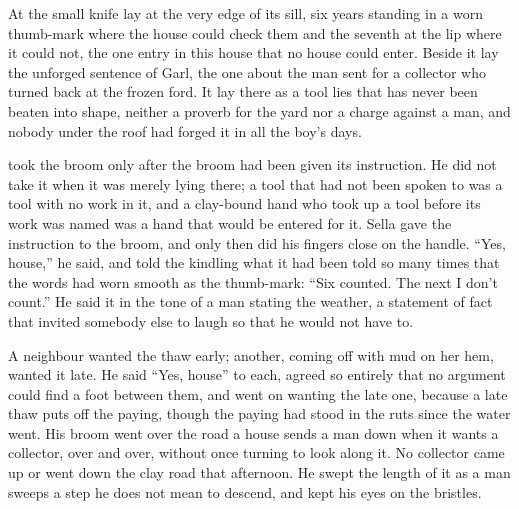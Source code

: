 \scenebreak

At  the small knife lay at the very edge of its sill, six years standing in a worn thumb-mark where the house could check them and the seventh at the lip where it could not, the one entry in this house that no house could enter. Beside it lay the unforged sentence of Garl, the one about the man sent for a collector who turned back at the frozen ford. It lay there as a tool lies that has never been beaten into shape, neither a proverb for the yard nor a charge against a man, and nobody under the roof had forged it in all the boy's days.

 took the broom only after the broom had been given its instruction. He did not take it when it was merely lying there; a tool that had not been spoken to was a tool with no work in it, and a clay-bound hand who took up a tool before its work was named was a hand that would be entered for it. Sella gave the instruction to the broom, and only then did his fingers close on the handle. “Yes, house,” he said, and told the kindling what it had been told so many times that the words had worn smooth as the thumb-mark: “Six counted. The next I don't count.” He said it in the tone of a man stating the weather, a statement of fact that invited somebody else to laugh so that he would not have to.

A neighbour wanted the thaw early; another, coming off  with mud on her hem, wanted it late. He said “Yes, house” to each, agreed so entirely that no argument could find a foot between them, and went on wanting the late one, because a late thaw puts off the paying, though the paying had stood in the ruts since the water went. His broom went over the road a house sends a man down when it wants a collector, over and over, without once turning to look along it. No collector came up or went down the clay road that afternoon. He swept the length of it as a man sweeps a step he does not mean to descend, and kept his eyes on the bristles.

